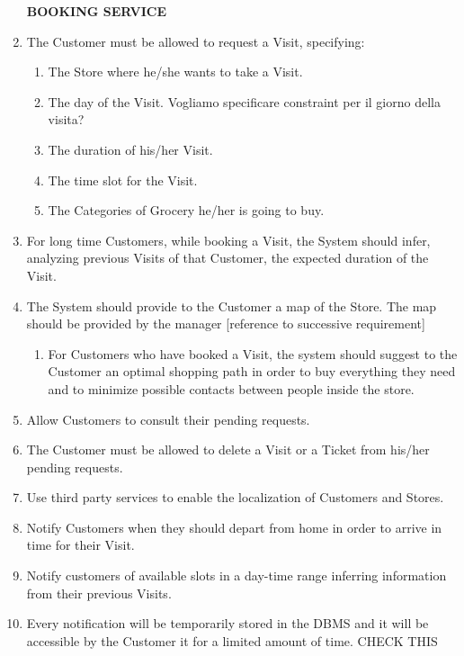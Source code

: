 \documentclass[a4paper, 10pt, oneside]{article}
\newcommand*{\lorenzo}[1]{\textcolor{BurntOrange}{#1}}
\begin{document}
\begin{enumerate}[align=left]
    \item[\textbf{BOOKING SERVICE}]
    \item The Customer must be allowed to request a Visit, specifying:
    \begin{enumerate}[label={-}]
        \item The Store where he/she wants to take a Visit.
        \item The day of the Visit. \lorenzo{Vogliamo specificare constraint per il giorno della visita?}
        \item The duration of his/her Visit.
        \item The time slot for the Visit.
        \item The Categories of Grocery he/her is going to buy.
    \end{enumerate}
    \item For long time Customers, while booking a Visit, the System should infer, analyzing previous Visits of that Customer, the expected duration of the Visit.
    \item The System should provide to the Customer a map of the Store. \lorenzo{The map should be provided by the manager [reference to successive requirement]}
    \begin{enumerate}[label={-}]
        \item For Customers who have booked a Visit, the system should suggest to the Customer an optimal shopping path in order to buy everything they need and to minimize possible contacts between people inside the store.
    \end{enumerate}
    \item Allow Customers to consult their pending requests.
    \item The Customer must be allowed to delete a Visit or a Ticket from his/her pending requests.
    \item Use third party services to enable the localization of Customers and Stores. 
    \item \lorenzo{Notify Customers when they should depart from home in order to arrive in time for their Visit.}
    \item Notify customers of available slots in a day-time range inferring information from their previous Visits.
    
    \item Every notification will be temporarily stored in the DBMS and it will be accessible by the Customer it for a limited amount of time. \lorenzo{CHECK THIS}
    

\end{enumerate}
\end{document}
